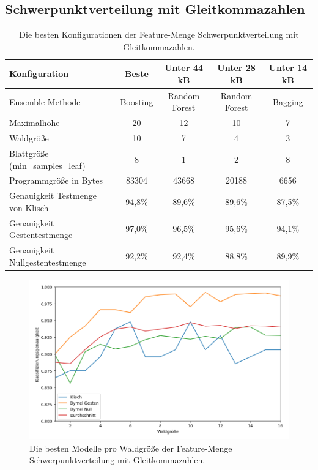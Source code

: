 \subsection{Schwerpunktverteilung mit Gleitkommazahlen}
\begin{table}[h!]
    \hspace{-0.75cm}
    \begin{tabular}{ | l | c | c | c | c |}
        \hline
        Konfiguration & Beste & Unter 44 kB & Unter 28 kB & Unter 14 kB \\\hline
        Ensemble-Methode & Boosting & Random Forest & Random Forest & Bagging  \\\hline
        Maximalhöhe & 20 & 12 & 10 & 7 \\\hline
        Waldgröße & 10 & 7 & 4 & 3 \\\hline
        Blattgröße (min\_samples\_leaf) & 8 & 1 & 2 & 8 \\\hline
        Programmgröße in Bytes & 83304 & 43668 & 20188 & 6656 \\\hline
        Genauigkeit Testmenge von Klisch & 94,8\% & 89,6\% & 89,6\% & 87,5\% \\\hline
        Genauigkeit Gestentestmenge & 97,0\% & 96,5\% & 95,6\% & 94,1\% \\\hline
        Genauigkeit Nullgestentestmenge & 92,2\% & 92,4\% & 88,8\% & 89,9\% \\\hline
    \end{tabular}
    \caption{Die besten Konfigurationen der Feature-Menge Schwerpunktverteilung mit Gleitkommazahlen.}
    \label{tab:schwerpunktverteilung_float}
\end{table}
\begin{figure}[h!]
    \centering
    \includegraphics[width=\linewidth]{images/cocd_float_acc_per_size.png}
    \caption{Die besten Modelle pro Waldgröße der Feature-Menge Schwerpunktverteilung mit Gleitkommazahlen.}
    \label{fig:cocd_float_per_forest_size}
\end{figure}
